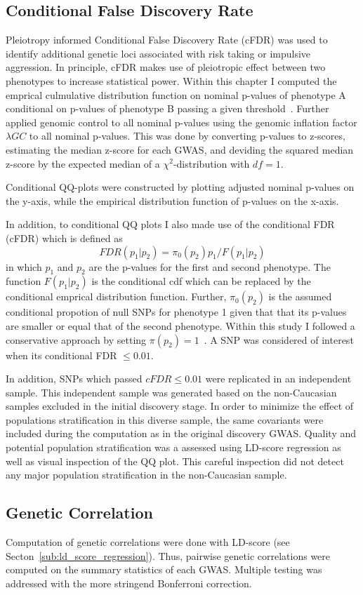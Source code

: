 \subsection{Conditional False Discovery Rate}
\label{sub:conditional_false_discovery_rate}

Pleiotropy informed Conditional False Discovery Rate (cFDR) was used to identify additional genetic loci associated with risk taking or impulsive aggression. 
In principle, cFDR makes use of pleiotropic effect between two phenotypes to increase statistical power.
Within this chapter I computed the emprical culmulative distribution function on nominal p-values of phenotype A conditional on p-values of phenotype B passing a given threshold~\cite{Andreassen2013}.
Further applied genomic control to all nominal p-values using the genomic inflation factor $\lambda{GC}$ to all nominal p-values.
This was done by converting p-values to z-scores, estimating the median z-score for each GWAS, and deviding the squared median z-score by the expected median of a $\chi^2$-distribution  with $df=1$.

Conditional QQ-plots were constructed by plotting adjusted nominal p-values on the y-axis, while the empirical distribution function of p-values on the x-axis.

In addition, to conditional QQ plots I also made use of the conditional FDR (cFDR) which is defined as~\cite{Andreassen2013}
\begin{equation}
  FDR(p_1|p_2)=\pi_0(p_2)p_1/F(p_1|p_2)
\end{equation}
in which $p_1$ and $p_2$ are the p-values for the first and second phenotype.
The function $F(p_1|p_2)$ is the conditional cdf which can be replaced by the conditional emprical distribution function.
Further, $\pi_0(p_2)$ is the assumed conditional propotion of null SNPs for phenotype 1 given that that its p-values are smaller or equal that of the second phenotype.
Within this study I followed a conservative approach by setting $\pi(p_2)=1$~\citet{Andreassen2013}.
A SNP was considered of interest when its conditional FDR $\leq 0.01$.

In addition, SNPs which passed $cFDR\leq 0.01$ were replicated in an independent sample.
This independent sample was generated based on the non-Caucasian samples excluded in the initial discovery stage.
In order to minimize the effect of populations stratification in this diverse sample, the same covariants were included during the computation as in the original discovery GWAS\@.
Quality and potential population stratification was a assessed using LD-score regression as well as visual inspection of the QQ plot.
This careful inspection did not detect any major population stratification in the non-Caucasian sample.

\subsection{Genetic Correlation}
\label{sub:genetic_correlation_ukb_assoc}

Computation of genetic correlations were done with LD-score (see Secton~\ref{sub:ld_score_regression}).
Thus, pairwise genetic correlations were computed on the summary statistics of each GWAS\@.
Multiple testing was addressed with the more stringend Bonferroni correction.
